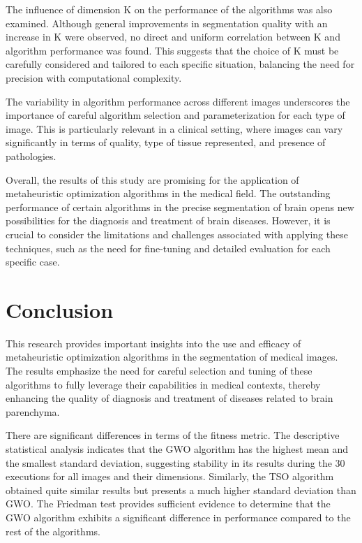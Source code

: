 \documentclass{elsarticle}
\begin{document}
\noindent The influence of dimension K on the performance of the algorithms was also examined. Although general improvements in segmentation quality with an increase in K were observed, no direct and uniform correlation between K and algorithm performance was found. This suggests that the choice of K must be carefully considered and tailored to each specific situation, balancing the need for precision with computational complexity.

\noindent The variability in algorithm performance across different images underscores the importance of careful algorithm selection and parameterization for each type of image. This is particularly relevant in a clinical setting, where images can vary significantly in terms of quality, type of tissue represented, and presence of pathologies.

\noindent Overall, the results of this study are promising for the application of metaheuristic optimization algorithms in the medical field. The outstanding performance of certain algorithms in the precise segmentation of brain opens new possibilities for the diagnosis and treatment of brain diseases. However, it is crucial to consider the limitations and challenges associated with applying these techniques, such as the need for fine-tuning and detailed evaluation for each specific case.

\section{Conclusion} \label{sec:co}

\noindent This research provides important insights into the use and efficacy of metaheuristic optimization algorithms in the segmentation of medical images. The results emphasize the need for careful selection and tuning of these algorithms to fully leverage their capabilities in medical contexts, thereby enhancing the quality of diagnosis and treatment of diseases related to brain parenchyma.

\noindent There are significant differences in terms of the fitness metric. The descriptive statistical analysis indicates that the GWO algorithm has the highest mean and the smallest standard deviation, suggesting stability in its results during the 30 executions for all images and their dimensions. Similarly, the TSO algorithm obtained quite similar results but presents a much higher standard deviation than GWO. The Friedman test provides sufficient evidence to determine that the GWO algorithm exhibits a significant difference in performance compared to the rest of the algorithms.
\end{document}
